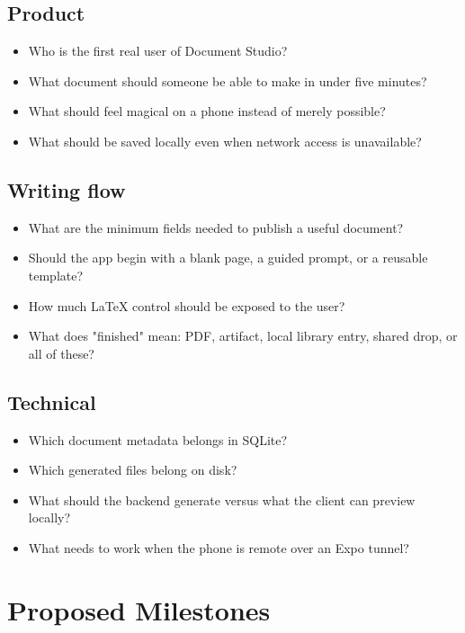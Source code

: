 \documentclass[11pt]{article}
\begin{document}
\subsection{Product}
\label{sec:orgd9cd839}

\begin{itemize}
\item Who is the first real user of Document Studio?
\item What document should someone be able to make in under five minutes?
\item What should feel magical on a phone instead of merely possible?
\item What should be saved locally even when network access is unavailable?
\end{itemize}
\subsection{Writing flow}
\label{sec:org186796d}

\begin{itemize}
\item What are the minimum fields needed to publish a useful document?
\item Should the app begin with a blank page, a guided prompt, or a reusable template?
\item How much \LaTeX{} control should be exposed to the user?
\item What does "finished" mean: PDF, artifact, local library entry, shared drop, or all of these?
\end{itemize}
\subsection{Technical}
\label{sec:org4c37c5d}

\begin{itemize}
\item Which document metadata belongs in SQLite?
\item Which generated files belong on disk?
\item What should the backend generate versus what the client can preview locally?
\item What needs to work when the phone is remote over an Expo tunnel?
\end{itemize}
\section{Proposed Milestones}
\label{sec:org4265b8c}
\end{document}
